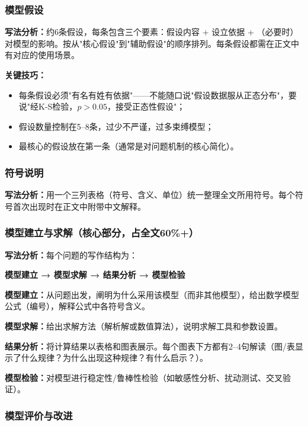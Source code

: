 \documentclass[12pt,a4paper]{ctexart}
\begin{document}
\subsubsection{模型假设}

\textbf{写法分析：}约6条假设，每条包含三个要素：假设内容 + 设立依据 + （必要时）对模型的影响。按从"核心假设"到"辅助假设"的顺序排列。每条假设都需在正文中有对应的使用场景。

\textbf{关键技巧：}
\begin{itemize}[leftmargin=*]
    \item 每条假设必须"有名有姓有依据"——不能随口说"假设数据服从正态分布"，要说"经K-S检验，$p>0.05$，接受正态性假设"；
    \item 假设数量控制在5--8条，过少不严谨，过多束缚模型；
    \item 最核心的假设放在第一条（通常是对问题机制的核心简化）。
\end{itemize}

\subsubsection{符号说明}

\textbf{写法分析：}用一个三列表格（符号、含义、单位）统一整理全文所用符号。每个符号首次出现时在正文中附带中文解释。

\subsubsection{模型建立与求解（核心部分，占全文60\%+）}

\textbf{写法分析：}每个问题的写作结构为：

\begin{center}
\textbf{模型建立 → 模型求解 → 结果分析 → 模型检验}
\end{center}

\textbf{模型建立：}从问题出发，阐明为什么采用该模型（而非其他模型），给出数学模型公式（编号），解释公式中各符号含义。

\textbf{模型求解：}给出求解方法（解析解或数值算法），说明求解工具和参数设置。

\textbf{结果分析：}将计算结果以表格和图表展示。每个图表下方都有2--4句解读（图/表显示了什么规律？为什么出现这种规律？有什么启示？）。

\textbf{模型检验：}对模型进行稳定性/鲁棒性检验（如敏感性分析、扰动测试、交叉验证）。

\subsubsection{模型评价与改进}
\end{document}
